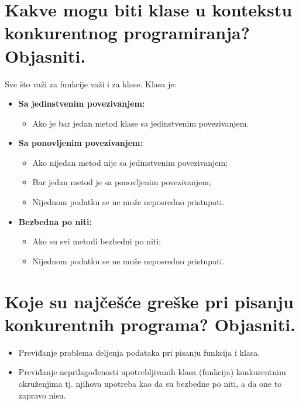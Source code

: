 \documentclass[a4paper]{article}
\begin{document}
\section{Kakve mogu biti klase u kontekstu konkurentnog programiranja? Objasniti.}
  Sve što važi za funkcije važi i za klase. Klasa je:
  \begin{itemize}
    \item \textbf{Sa jedinstvenim povezivanjem:}
          \begin{itemize}
            \item Ako je bar jedan metod klase sa jedinstvenim povezivanjem.
          \end{itemize}
    \item \textbf{Sa ponovljenim povezivanjem:}
          \begin{itemize}  
            \item Ako nijedan metod nije sa jedinstvenim povezivanjem;
            \item Bar jedan metod je sa ponovljenim povezivanjem;
            \item Nijednom podatku se ne može neposredno pristupati.
          \end{itemize}
    \item \textbf{Bezbedna po niti:}
          \begin{itemize}
            \item Ako su svi metodi bezbedni po niti;
            \item Nijednom podatku se ne može neposredno pristupati.
          \end{itemize}
  \end{itemize}
  
\section{Koje su najčešće greške pri pisanju konkurentnih programa? Objasniti.}
  \begin{itemize}
    \item Previđanje problema deljenja podataka pri pisanju funkcija i klasa.
    \item Previđanje neprilagođenosti upotrebljivanih klasa (funkcija) konkurentnim okruženjima tj. 
          njihova upotreba kao da su bezbedne po niti, a da one to zapravo nisu.
  \end{itemize}
  
\end{document}
